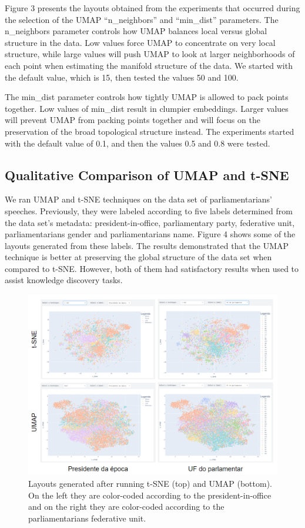 \documentclass[conference]{IEEEtran}
\begin{document}
Figure 3 presents the layouts obtained from the experiments that occurred during the selection of the UMAP “n\_neighbors” and “min\_dist” parameters. The n\_neighbors parameter controls how UMAP balances local versus global structure in the data. Low values force UMAP to concentrate on very local structure, while large values will push UMAP to look at larger neighborhoods of each point when estimating the manifold structure of the data.  We started with the default value, which is 15, then tested the values 50 and 100. 

The min\_dist parameter controls how tightly UMAP is allowed to pack points together. Low values of min\_dist result in clumpier embeddings. Larger values will prevent UMAP from packing points together and will focus on the preservation of the broad topological structure instead. The experiments started with the default value of 0.1, and then the values 0.5 and 0.8 were tested.

\subsection{Qualitative Comparison of UMAP and t-SNE}

We ran UMAP and t-SNE techniques on the data set of parliamentarians' speeches. Previously, they were labeled according to five labels determined from the data set's metadata: president-in-office, parliamentary party, federative unit, parliamentarians gender and parliamentarians name. Figure 4 shows some of the layouts generated from these labels. The results demonstrated that the UMAP technique is better at preserving the global structure of the data set when compared to t-SNE. However, both of them had satisfactory results when used to assist knowledge discovery tasks. 

\begin{figure}[htbp]
\centering
\includegraphics[width=.4\textwidth]{comparando_tsne_umap.png}
\caption{Layouts generated after running t-SNE (top) and UMAP (bottom). On the left they are color-coded according to the president-in-office and on the right they are color-coded according to the parliamentarians federative unit.}
\label{fig}
\end{figure}
\end{document}
